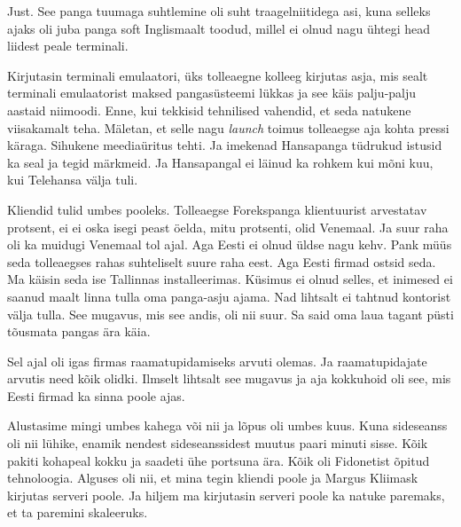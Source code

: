 
Just. See panga tuumaga suhtlemine oli suht traagelniitidega asi, kuna selleks 
ajaks oli juba panga soft  Inglismaalt toodud, millel ei olnud nagu ühtegi head 
liidest peale terminali.


Kirjutasin terminali emulaatori, üks tolleaegne kolleeg kirjutas asja, mis 
sealt terminali emulaatorist maksed pangasüsteemi lükkas ja see käis 
palju-palju aastaid niimoodi. Enne, kui  tekkisid tehnilised vahendid, et seda 
natukene viisakamalt teha. Mäletan, et  selle nagu \emph{launch} toimus 
tolleaegse  aja kohta pressi käraga. Sihukene meediaüritus tehti. Ja imekenad 
Hansapanga tüdrukud istusid ka seal ja tegid märkmeid. Ja 
Hansapangal ei läinud ka rohkem kui mõni kuu, kui 
Telehansa välja tuli.


Kliendid tulid umbes pooleks.  Tolleaegse Forekspanga klientuurist arvestatav 
protsent, ei ei oska isegi peast öelda, mitu protsenti, olid Venemaal. Ja suur 
raha oli ka muidugi Venemaal tol ajal. Aga Eesti ei olnud üldse nagu kehv. Pank 
müüs seda tolleaegses rahas suhteliselt suure raha eest. Aga Eesti firmad 
ostsid seda. Ma käisin seda ise Tallinnas installeerimas. Küsimus ei olnud 
selles, et inimesed ei saanud maalt linna tulla oma panga-asju ajama. Nad 
lihtsalt ei tahtnud kontorist välja tulla. See mugavus, mis see andis, oli nii 
suur. Sa said oma laua tagant püsti tõusmata pangas ära käia.


Sel ajal oli igas firmas raamatupidamiseks arvuti olemas. Ja raamatupidajate 
arvutis need kõik olidki. Ilmselt lihtsalt see mugavus ja aja kokkuhoid oli 
see, mis  Eesti firmad ka sinna poole ajas.


Alustasime  mingi umbes kahega või nii ja  lõpus oli  umbes kuus. Kuna 
sideseanss oli nii lühike, enamik nendest sideseanssidest muutus paari minuti 
sisse. Kõik pakiti kohapeal  kokku ja saadeti ühe portsuna ära. Kõik oli 
Fidonetist õpitud tehnoloogia. Alguses oli nii, et mina tegin kliendi poole ja 
Margus Kliimask kirjutas serveri poole. Ja hiljem 
ma kirjutasin serveri poole ka natuke paremaks, et ta paremini skaleeruks. 

